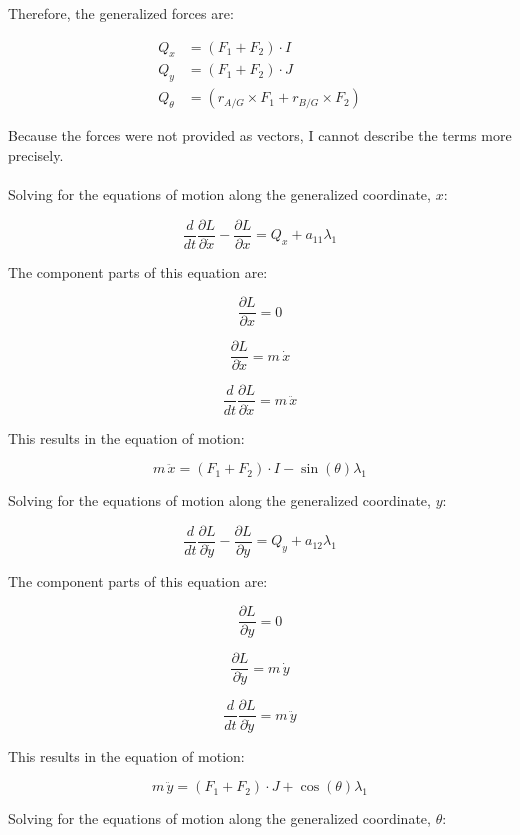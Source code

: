 \documentclass[12pt, letterpaper]{../assignment}
\begin{document}
Therefore, the generalized forces are:

\begin{equation*}
  \begin{aligned}
      Q_x &= \left( F_1 + F_2 \right) \cdot I\\
      Q_y &= \left( F_1 + F_2 \right) \cdot J\\
      Q_\theta &= \left(r_{A/G} \times F_1 + r_{B/G} \times F_2\right)
  \end{aligned}
\end{equation*}

Because the forces were not provided as vectors, I cannot describe the terms more precisely.
\\\\
Solving for the equations of motion along the generalized coordinate, $x$:

$$ \frac{d}{d t} \frac{\partial L}{\partial \dot{x}} - \frac{\partial L}{\partial x} = 
Q_{x} + a_{11} \lambda_1 $$

The component parts of this equation are:


$$ \frac{\partial L}{\partial x} = 0 $$

$$ \frac{\partial L}{\partial \dot{x}}  =
m\,\dot{x} $$

$$ \frac{d}{d t} \frac{\partial L}{\partial \dot{x}} =
 m\,\ddot{x} $$

 This results in the equation of motion:
 
 $$ m\,\ddot{x} =
 \left( F_1 + F_2 \right) \cdot I -\sin \left(\theta \right) \lambda_1 $$

 Solving for the equations of motion along the generalized coordinate, $y$:

 $$ \frac{d}{d t} \frac{\partial L}{\partial \dot{y}} - \frac{\partial L}{\partial y} = 
 Q_{y} + a_{12} \lambda_1 $$
 
 The component parts of this equation are:
 
 
 $$ \frac{\partial L}{\partial y} = 0 $$
 
 $$ \frac{\partial L}{\partial \dot{y}}  =
 m\,\dot{y} $$
 
 $$ \frac{d}{d t} \frac{\partial L}{\partial \dot{y}} =
m\,\ddot{y} $$
 
This results in the equation of motion:
  
$$ m\,\ddot{y} =
\left( F_1 + F_2 \right) \cdot J +\cos \left(\theta \right) \lambda_1 $$

Solving for the equations of motion along the generalized coordinate, $\theta$:
\end{document}
